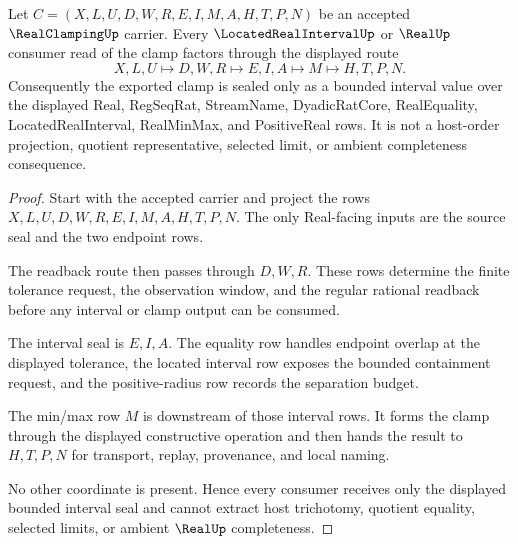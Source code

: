 \begin{theorem}
\label{thm:real-clamping-interval-seal}
Let $C=(X,L,U,D,W,R,E,I,M,A,H,T,P,N)$ be an accepted $\RealClampingUp$ carrier. Every $\LocatedRealIntervalUp$ or $\RealUp$ consumer read of the clamp factors through the displayed route
$$
X,L,U \longmapsto D,W,R \longmapsto E,I,A \longmapsto M \longmapsto H,T,P,N .
$$
Consequently the exported clamp is sealed only as a bounded interval value over the displayed Real, RegSeqRat, StreamName, DyadicRatCore, RealEquality, LocatedRealInterval, RealMinMax, and PositiveReal rows. It is not a host-order projection, quotient representative, selected limit, or ambient completeness consequence.
\end{theorem}
\begin{proof}
Start with the accepted carrier and project the rows $X,L,U,D,W,R,E,I,M,A,H,T,P,N$. The only Real-facing inputs are the source seal and the two endpoint rows.

The readback route then passes through $D,W,R$. These rows determine the finite tolerance request, the observation window, and the regular rational readback before any interval or clamp output can be consumed.

The interval seal is $E,I,A$. The equality row handles endpoint overlap at the displayed tolerance, the located interval row exposes the bounded containment request, and the positive-radius row records the separation budget.

The min/max row $M$ is downstream of those interval rows. It forms the clamp through the displayed constructive operation and then hands the result to $H,T,P,N$ for transport, replay, provenance, and local naming.

No other coordinate is present. Hence every consumer receives only the displayed bounded interval seal and cannot extract host trichotomy, quotient equality, selected limits, or ambient $\RealUp$ completeness.
\end{proof}

